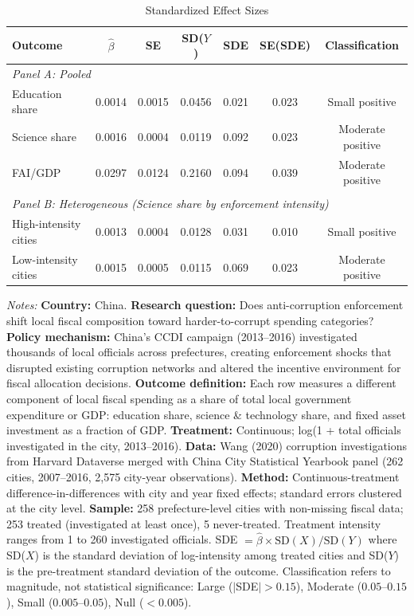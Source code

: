 \begin{table}[t]
\centering
\caption{Standardized Effect Sizes}
\label{tab:sde}
\small
\begin{tabular}{lcccccc}
\hline\hline
    Outcome & $\hat{\beta}$ & SE & SD($Y$) & SDE & SE(SDE) & Classification \\
\hline
    \multicolumn{7}{l}{\textit{Panel A: Pooled}} \\[3pt]
    Education share & 0.0014 & 0.0015 & 0.0456 & 0.021 & 0.023 & Small positive \\
    Science share & 0.0016 & 0.0004 & 0.0119 & 0.092 & 0.023 & Moderate positive \\
    FAI/GDP & 0.0297 & 0.0124 & 0.2160 & 0.094 & 0.039 & Moderate positive \\
    \\
    \multicolumn{7}{l}{\textit{Panel B: Heterogeneous (Science share by enforcement intensity)}} \\[3pt]
    High-intensity cities & 0.0013 & 0.0004 & 0.0128 & 0.031 & 0.010 & Small positive \\
    Low-intensity cities & 0.0015 & 0.0005 & 0.0115 & 0.069 & 0.023 & Moderate positive \\
\hline\hline
\end{tabular}
\begin{tablenotes}
\item \textit{Notes:} \textbf{Country:} China. \textbf{Research question:} Does anti-corruption enforcement shift local fiscal composition toward harder-to-corrupt spending categories? \textbf{Policy mechanism:} China's CCDI campaign (2013--2016) investigated thousands of local officials across prefectures, creating enforcement shocks that disrupted existing corruption networks and altered the incentive environment for fiscal allocation decisions. \textbf{Outcome definition:} Each row measures a different component of local fiscal spending as a share of total local government expenditure or GDP: education share, science \& technology share, and fixed asset investment as a fraction of GDP. \textbf{Treatment:} Continuous; log(1 + total officials investigated in the city, 2013--2016). \textbf{Data:} Wang (2020) corruption investigations from Harvard Dataverse merged with China City Statistical Yearbook panel (262 cities, 2007--2016, 2,575 city-year observations). \textbf{Method:} Continuous-treatment difference-in-differences with city and year fixed effects; standard errors clustered at the city level. \textbf{Sample:} 258 prefecture-level cities with non-missing fiscal data; 253 treated (investigated at least once), 5 never-treated. Treatment intensity ranges from 1 to 260 investigated officials. SDE $= \hat{\beta} \times \text{SD}(X) / \text{SD}(Y)$ where SD($X$) is the standard deviation of log-intensity among treated cities and SD($Y$) is the pre-treatment standard deviation of the outcome. Classification refers to magnitude, not statistical significance: Large ($|$SDE$| > 0.15$), Moderate ($0.05$--$0.15$), Small ($0.005$--$0.05$), Null ($< 0.005$).
\end{tablenotes}
\end{table}
